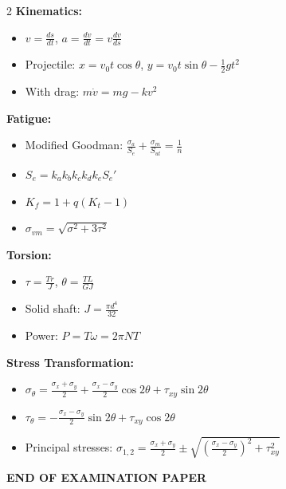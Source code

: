 \documentclass[12pt,a4paper]{article}
\begin{document}
\begin{tcolorbox}[colback=white,colframe=examblue,title=\bfseries MECHANICS FORMULA SHEET]
\begin{multicols}{2}
\textbf{Kinematics:}
\begin{itemize}
    \item $v = \frac{ds}{dt}$, $a = \frac{dv}{dt} = v\frac{dv}{ds}$
    \item Projectile: $x = v_0 t\cos\theta$, $y = v_0 t\sin\theta - \frac{1}{2}gt^2$
    \item With drag: $m\dot{v} = mg - kv^2$
\end{itemize}

\textbf{Fatigue:}
\begin{itemize}
    \item Modified Goodman: $\frac{\sigma_a}{S_e} + \frac{\sigma_m}{S_{ut}} = \frac{1}{n}$
    \item $S_e = k_a k_b k_c k_d k_e S_e'$
    \item $K_f = 1 + q(K_t - 1)$
    \item $\sigma_{vm} = \sqrt{\sigma^2 + 3\tau^2}$
\end{itemize}

\textbf{Torsion:}
\begin{itemize}
    \item $\tau = \frac{Tr}{J}$, $\theta = \frac{TL}{GJ}$
    \item Solid shaft: $J = \frac{\pi d^4}{32}$
    \item Power: $P = T\omega = 2\pi NT$
\end{itemize}

\textbf{Stress Transformation:}
\begin{itemize}
    \item $\sigma_{\theta} = \frac{\sigma_x+\sigma_y}{2} + \frac{\sigma_x-\sigma_y}{2}\cos 2\theta + \tau_{xy}\sin 2\theta$
    \item $\tau_{\theta} = -\frac{\sigma_x-\sigma_y}{2}\sin 2\theta + \tau_{xy}\cos 2\theta$
    \item Principal stresses: $\sigma_{1,2} = \frac{\sigma_x+\sigma_y}{2} \pm \sqrt{(\frac{\sigma_x-\sigma_y}{2})^2 + \tau_{xy}^2}$
\end{itemize}
\end{multicols}
\end{tcolorbox}

\vspace{1cm}
\begin{center}
\textbf{\large END OF EXAMINATION PAPER}
\end{center}
\end{document}
